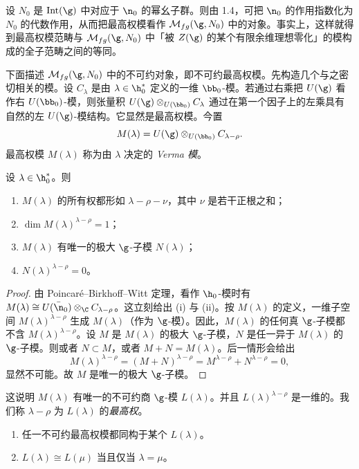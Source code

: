 设 $N_0$ 是 $\operatorname{Int}(\g)$ 中对应于 $\n_0$ 的幂幺子群。则由 1.4，可把 $\n_0$ 的作用指数化为 $N_0$ 的代数作用，从而把最高权模看作 $\mathcal{M}_{fg}(\g,N_0)$ 中的对象。事实上，这样就得到最高权模范畴与 $\mathcal{M}_{fg}(\g,N_0)$ 中「被 $Z(\g)$ 的某个有限余维理想零化」的模构成的全子范畴之间的等同。

下面描述 $\mathcal{M}_{fg}(\g,N_0)$ 中的不可约对象，即不可约最高权模。先构造几个与之密切相关的模。设 $C_\lambda$ 是由 $\lambda\in\h_0^*$ 定义的一维 $\bb_0$-模。若通过右乘把 $U(\g)$ 看作右 $U(\bb_0)$-模，则张量积 $U(\g)\otimes_{U(\bb_0)}C_\lambda$ 通过在第一个因子上的左乘具有自然的左 $U(\g)$-模结构。它显然是最高权模。今置
$$M(\lambda)=U(\g)\otimes_{U(\bb_0)}C_{\lambda-\rho}.$$
最高权模 $M(\lambda)$ 称为由 $\lambda$ 决定的 \emph{Verma 模}。

\begin{lemma}\label{lem:05.1.5}
设 $\lambda\in\h_0^*$。则
\begin{enumerate}[label=(\roman*)]
\item $M(\lambda)$ 的所有权都形如 $\lambda-\rho-\nu$，其中 $\nu$ 是若干正根之和；
\item $\dim M(\lambda)^{\lambda-\rho}=1$；
\item $M(\lambda)$ 有唯一的极大 $\g$-子模 $N(\lambda)$；
\item $N(\lambda)^{\lambda-\rho}=0$。
\end{enumerate}
\end{lemma}

\begin{proof}
由 Poincaré--Birkhoff--Witt 定理，看作 $\h_0$-模时有 $M(\lambda)\cong U(\bar{\n}_0)\otimes_\C C_{\lambda-\rho}$。这立刻给出 (i) 与 (ii)。按 $M(\lambda)$ 的定义，一维子空间 $M(\lambda)^{\lambda-\rho}$ 生成 $M(\lambda)$（作为 $\g$-模）。因此，$M(\lambda)$ 的任何真 $\g$-子模都不含 $M(\lambda)^{\lambda-\rho}$。设 $M$ 是 $M(\lambda)$ 的极大 $\g$-子模，$N$ 是任一异于 $M(\lambda)$ 的 $\g$-子模。则或者 $N\subset M$，或者 $M+N=M(\lambda)$。后一情形会给出
$$M(\lambda)^{\lambda-\rho}=(M+N)^{\lambda-\rho}=M^{\lambda-\rho}+N^{\lambda-\rho}=0,$$
显然不可能。故 $M$ 是唯一的极大 $\g$-子模。
\end{proof}

这说明 $M(\lambda)$ 有唯一的不可约商 $\g$-模 $L(\lambda)$。并且 $L(\lambda)^{\lambda-\rho}$ 是一维的。我们称 $\lambda-\rho$ 为 $L(\lambda)$ 的\emph{最高权}。

\begin{proposition}\label{prop:05.1.6}
\begin{enumerate}[label=(\roman*)]
\item 任一不可约最高权模都同构于某个 $L(\lambda)$。
\item $L(\lambda)\cong L(\mu)$ 当且仅当 $\lambda=\mu$。
\end{enumerate}
\end{proposition}

